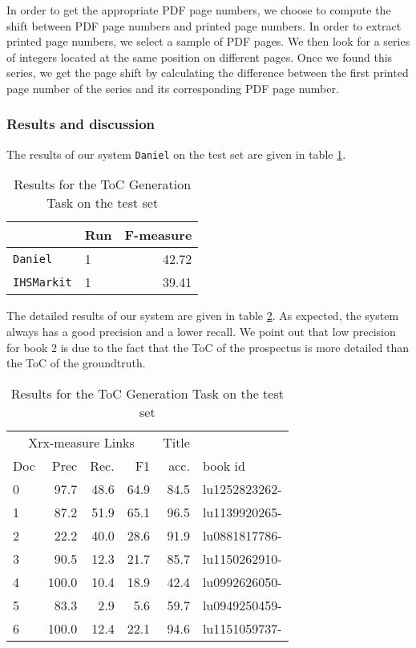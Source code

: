 In order to get the appropriate PDF page numbers, we choose to compute the shift
between PDF page numbers and printed page numbers. In order to
extract printed page numbers, we select a sample of PDF pages. We then
look for a series of integers located at the same position on
different pages. Once we found this series, we get the page shift by calculating
the difference between the first printed page number of the series and its
corresponding PDF page number.

\subsubsection{Results and discussion}

The results of our system \texttt{Daniel} on the test set are given in table \ref{res:toc}.   

\begin{table}
\begin{tabular}{l|l|r}
     & Run & F-measure\\\hline
\texttt{Daniel}  & 1 &      42.72\\\hline
\texttt{IHSMarkit} & 1 &   39.41
\end{tabular}
\caption{Results for the ToC Generation Task on the test set}
\label{res:toc}
\end{table}

The detailed results of our system are given in table \ref{res:detail}.
As expected, the system always has a good precision and a lower recall.
We point out that low precision for book 2 is due to the fact that
the ToC of the prospectus is more detailed than the ToC of the groundtruth.

\begin{table}
\begin{tabular}{l|r|r|r|r|l}
  \multicolumn{4}{c}{Xrx-measure Links}  &  Title & \\
 Doc &  Prec & Rec. &    F1 &  acc.  & book id      \\\hline
   0 &  97.7 & 48.6 &  64.9 &  84.5  & lu1252823262-\\\hline
   1 &  87.2 & 51.9 &  65.1 &  96.5  & lu1139920265-\\\hline
   2 &  22.2 & 40.0 &  28.6 &  91.9  & lu0881817786-\\\hline
   3 &  90.5 & 12.3 &  21.7 &  85.7  & lu1150262910-\\\hline
   4 & 100.0 & 10.4 &  18.9 &  42.4  & lu0992626050-\\\hline
   5 &  83.3 &  2.9 &   5.6 &  59.7  & lu0949250459-\\\hline
   6 & 100.0 & 12.4 &  22.1 &  94.6  & lu1151059737-\\\hline
\end{tabular}
\caption{Results for the ToC Generation Task on the test set}
\label{res:detail}
\end{table}

